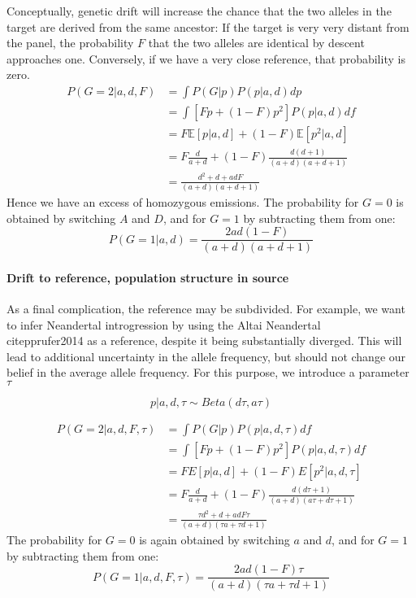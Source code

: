 \documentclass[10pt,a4paper]{article}
\newcommand{\BE}[1]{\mathbb{E}\left[#1\right]}
\begin{document}
Conceptually, genetic drift will increase the chance that the two alleles in the target are derived from the same ancestor: If the target is very very distant from the panel, the probability $F$ that the two alleles are identical by descent approaches one.  Conversely, if we have a very close reference, that probability is zero. 
\begin{align}
P(G=2 | a,d, F) &= \int P(G|p) P(p | a, d) dp \nonumber\\
&= \int \left[ F p + (1-F) p^2\right] P(p | a, d) df\nonumber\\
&= F \BE{p|a, d} + (1-F)  \BE{p^2|a, d}\\
&= F \frac{d}{a+d} + (1-F)  \frac{d (d+1)}{(a+d)(a+d+1)}\nonumber\\
&= \frac{d^2 + d + adF}{(a+d)(a+d+1)}
\end{align}
Hence we have an excess of homozygous emissions. The probability for $G=0$ is obtained by switching $A$ and $D$, and for $G=1$ by subtracting them from one:
\begin{equation}
P(G=1 | a,d) = \frac{2ad(1-F)}{(a+d)(a+d+1)}
\end{equation} 

\paragraph{Drift to reference, population structure in source}
As a final complication, the reference may be subdivided. For example, we want to infer Neandertal introgression by using the Altai Neandertal \\citep{prufer2014} as a reference, despite it being substantially diverged. This will lead to additional uncertainty in the allele frequency, but should not change our belief in the average allele frequency. For this purpose, we introduce a parameter $\tau$

\begin{equation}
p| a, d, \tau \sim Beta (d\tau, a\tau)
\end{equation}



\begin{align}
P(G=2 | a,d, F, \tau) &= \int P(G|p) P(p | a, d, \tau) df\nonumber\\
&= \int \left[ F p + (1-F) p^2\right] P(p | a, d, \tau) df\nonumber\\
&= F E[p|a,d] + (1-F)  E[p^2|a, d, \tau]\nonumber\\
&= F \frac{d}{a+d} + (1-F)  \frac{d (d\tau+1)}{(a+d)(a\tau+d\tau+1)}\nonumber\\
&= \frac{\tau d^2 + d + adF\tau}{(a+d)(\tau a+\tau d+1)}
\end{align}
The probability for $G=0$ is again obtained by switching $a$ and $d$, and for $G=1$ by subtracting them from one:
\begin{equation}
P(G=1 | a,d, F, \tau) = \frac{2ad(1-F)\tau}{(a+d)(\tau a+\tau d+1)}
\end{equation} 
\end{document}
